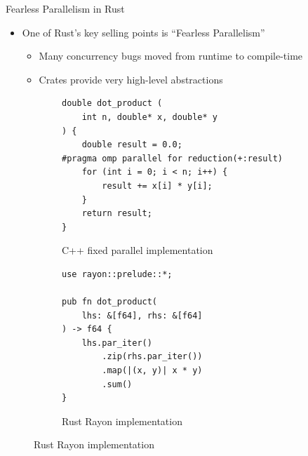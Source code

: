 \documentclass[10pt,aspectratio=169]{beamer}
\begin{document}
\begin{frame}[fragile]{Fearless Parallelism in Rust}
    \begin{itemize}
        \item One of Rust's key selling points is ``Fearless Parallelism''
        \begin{itemize}
            \item Many concurrency bugs moved from runtime to compile-time
            \item Crates provide very high-level abstractions
        \end{itemize}
    \end{itemize}    
    \vspace*{0.15cm}

    \begin{figure}
        \begin{subfigure}[c]{.55\textwidth}\centering
            \begin{verbatim}
double dot_product (
    int n, double* x, double* y
) {
    double result = 0.0;
#pragma omp parallel for reduction(+:result)
    for (int i = 0; i < n; i++) {
        result += x[i] * y[i];
    }
    return result;
}
            \end{verbatim}
            \label{fig:cpp-ddot-openmp-reduction-2}
            \vspace*{-0.5cm}
            \caption{C++ fixed parallel implementation}
        \end{subfigure}%
        \begin{subfigure}[c]{.45\textwidth}\centering
            \begin{verbatim}
use rayon::prelude::*; 

pub fn dot_product(
    lhs: &[f64], rhs: &[f64]
) -> f64 {
    lhs.par_iter()
        .zip(rhs.par_iter())
        .map(|(x, y)| x * y)
        .sum()
}
            \end{verbatim}
            \label{fig:rust-ddot-rayon}
            \vspace*{0.1cm}
            \caption{Rust Rayon implementation}
        \end{subfigure}
    \end{figure}
\end{frame}
\end{document}
